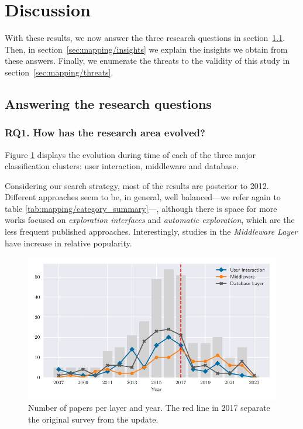 \section{Discussion}
\label{sec:mapping/discussion}

With these results, we now answer the three research questions in
section~\ref{sec:mapping/answers}. Then, in section~\ref{sec:mapping/insights}
we explain the insights we obtain from these answers. Finally,
we enumerate the threats to the validity of this study in
section~\ref{sec:mapping/threats}.

\subsection{Answering the research questions}
\label{sec:mapping/answers}

\subsubsection{RQ1. How has the research area evolved?}
Figure \ref{fig:mapping/layers_histogram} displays the evolution during time
of each of the three major classification clusters: user interaction,
middleware and database.

Considering our search strategy, most of the
results are posterior to 2012. Different approaches seem to be, in general, well
balanced---we refer again to table \ref{tab:mapping/category_summary}---, although there
is space for more works focused on \emph{exploration interfaces} and
\emph{automatic exploration}, which are the less frequent published approaches. Interestingly,
studies in the \emph{Middleware Layer} have increase in relative popularity.

\begin{figure}[hptb]
    \centering
    \includegraphics{images/3_mapping/layer_histogram}
    \caption[Number of studies per  layer and year.]{
        Number of papers per layer and year.
        The red line in 2017 separate the original survey from the update.
    }
    \label{fig:mapping/layers_histogram}
\end{figure}

